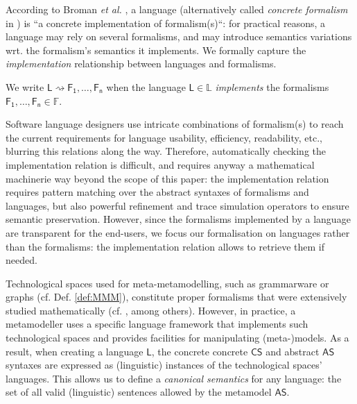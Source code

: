 According to Broman \emph{et al.} \cite{Broman-etAl:2012}, a language 
(alternatively called \emph{concrete formalism} in \cite{P:MPM:2006}) is ``a 
concrete implementation of formalism(s)``: 
for practical reasons, a language may rely on several 
formalisms, and may introduce semantics variations wrt. the formalism's 
semantics it implements. We formally capture the \emph{implementation} 
relationship between languages and formalisms.

\begin{Definition}
   We write $\mathsf{L} \rightsquigarrow \mathsf{F_1}, \ldots, \mathsf{F_n}$ 
when the language $\mathsf{L}\in\mathbb{L}$ \emph{implements} the formalisms 
$\mathsf{F_1}, \ldots, \mathsf{F_n}\in\mathbb{F}$.
\end{Definition}
\noindent
Software language designers use intricate combinations of formalism(s) to reach 
the current requirements for language usability, efficiency, readability, etc., 
blurring this relations along the way. 
Therefore, automatically checking the implementation relation is difficult, and 
requires anyway a mathematical machinerie way beyond the scope of this paper: 
the implementation relation requires pattern matching over the abstract 
syntaxes of formalisms and languages, but also powerful refinement and 
trace simulation operators to ensure semantic preservation. 
However, since the formalisms implemented by a language are transparent for the 
end-users, we focus our formalisation on languages rather than the formalisms: 
the implementation relation allows to retrieve them if needed.

Technological spaces used for meta-metamodelling, such as grammarware or 
graphs (cf. Def. \ref{def:MMM}), constitute proper formalisms that were 
extensively studied mathematically (cf. 
\cite{B:Rozenberg:1997,B:Aho-etAl:2006}, 
among others). However, in practice, a metamodeller uses a specific language 
framework that implements such technological spaces and provides facilities for 
manipulating (meta-)models. As a result, when creating a language $\mathsf{L}$,
the concrete concrete $\mathsf{CS}$ and abstract $\mathsf{AS}$ syntaxes are 
expressed as (linguistic) instances of the technological spaces' languages. 
This allows us to define a \emph{canonical semantics} for any language: the set 
of all valid (linguistic) sentences allowed by the metamodel $\mathsf{AS}$. 

